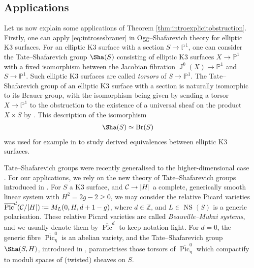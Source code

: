 \documentclass[11pt,twoside]{amsart}
\numberwithin{equation}{section}
\theoremstyle{definition}
\theoremstyle{plain}
\newcommand{\Z}{\ensuremath{\mathbb{Z}}}
\newcommand{\PP}{\ensuremath{\mathbb{P}}}
\def\NS{\operatorname{NS}}
\def\olPic{\overline{\operatorname{Pic}}}
\def\Br{\operatorname{Br}}
\def\Jac{\operatorname{J}}
\begin{document}
\subsection*{Applications} 
Let us now explain some applications of Theorem \ref{thm:introexplicitobstruction}.
Firstly, one can apply \eqref{eq:introsesbrauer} in Ogg--Shafarevich theory for elliptic K3 surfaces. For an elliptic K3 surface with a section $S\to \PP^1$, one can consider the Tate--Shafarevich group $\Sha(S)$ consisting of elliptic K3 surfaces $X\to \PP^1$ with a fixed isomorphism between the Jacobian fibration $\Jac^0(X)\to \PP^1$ and $S\to \PP^1$. Such elliptic K3 surfaces are called \textit{torsors} of $S\to \PP^1$. The Tate--Shafarevich group of an elliptic K3 surface with a section is naturally isomorphic to its Brauer group, with the isomorphism being given by sending a torsor $X\to \PP^1$ to the obstruction to the existence of a universal sheaf on the product $X\times S$ by \cite[Theorem 4.4.1]{Cal00}. This description of the isomorphism 
\begin{equation}\label{eq:introoggshafarevich}
    \Sha(S)\simeq \Br(S)
\end{equation}
was used for example in \cite{MS24} to study derived equivalences between elliptic K3 surfaces.

Tate--Shafarevich groups were recently generalised to the higher-dimensional case \cite{Mar14,AR23,HM23}. For our applications, we rely on the new theory of Tate--Shafarevich groups introduced in \cite{HM23}. For $S$ a K3 surface, and $\mathcal{C}\to |H|$ a complete, generically smooth linear system with $H^2 = 2g-2 \geq 0$, we may consider the relative Picard varieties $\olPic^d(\calC/|H|)\coloneqq M_L(0,H,d+1-g)$, where $d\in \Z$, and $L\in \NS(S)$ is a generic polarisation. These relative Picard varieties are called \textit{Beauville--Mukai systems}, and we usually denote them by $\olPic^d$ to keep notation light. For $d=0$, the generic fibre $\olPic^0_\eta$ is an abelian variety, and the Tate--Shafarevich group $\Sha(S,H)$, introduced in \cite{HM23}, parametrises those torsors of $\olPic^0_\eta$ which compactify to moduli spaces of (twisted) sheaves on $S$. 
\end{document}
